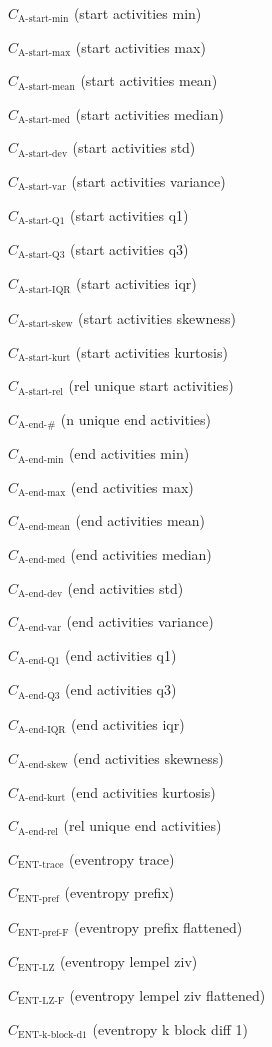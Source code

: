 \documentclass[a4paper]{article}
\newcommand{\startactivitiesrelname}{\text{A-start-rel}}
\newcommand{\startactivitiesrel}{C_{\startactivitiesrelname}}
\newcommand{\startminname}{\text{A-start-min}}
\newcommand{\startmin}{C_{\startminname}}
\newcommand{\startmaxname}{\text{A-start-max}}
\newcommand{\startmax}{C_{\startmaxname}}
\newcommand{\startmeanname}{\text{A-start-mean}}
\newcommand{\startmean}{C_{\startmeanname}}
\newcommand{\startmedianname}{\text{A-start-med}}
\newcommand{\startmedian}{C_{\startmedianname}}
\newcommand{\startdevname}{\text{A-start-dev}}
\newcommand{\startdev}{C_{\startdevname}}
\newcommand{\startvarname}{\text{A-start-var}}
\newcommand{\startvar}{C_{\startvarname}}
\newcommand{\startqonename}{\text{A-start-Q1}}
\newcommand{\startqone}{C_{\startqonename}}
\newcommand{\startqthreename}{\text{A-start-Q3}}
\newcommand{\startqthree}{C_{\startqthreename}}
\newcommand{\startiqrname}{\text{A-start-IQR}}
\newcommand{\startiqr}{C_{\startiqrname}}
\newcommand{\startskewname}{\text{A-start-skew}}
\newcommand{\startskew}{C_{\startskewname}}
\newcommand{\startkurtname}{\text{A-start-kurt}}
\newcommand{\startkurt}{C_{\startkurtname}}
\newcommand{\lastactivitiesname}{\text{A-end-\#}}
\newcommand{\lastactivities}{C_{\lastactivitiesname}}
\newcommand{\lastactivitiesrelname}{\text{A-end-rel}}
\newcommand{\lastactivitiesrel}{C_{\lastactivitiesrelname}}
\newcommand{\lastminname}{\text{A-end-min}}
\newcommand{\lastmin}{C_{\lastminname}}
\newcommand{\lastmaxname}{\text{A-end-max}}
\newcommand{\lastmax}{C_{\lastmaxname}}
\newcommand{\lastmeanname}{\text{A-end-mean}}
\newcommand{\lastmean}{C_{\lastmeanname}}
\newcommand{\lastmedianname}{\text{A-end-med}}
\newcommand{\lastmedian}{C_{\lastmedianname}}
\newcommand{\lastdevname}{\text{A-end-dev}}
\newcommand{\lastdev}{C_{\lastdevname}}
\newcommand{\lastvarname}{\text{A-end-var}}
\newcommand{\lastvar}{C_{\lastvarname}}
\newcommand{\lastqonename}{\text{A-end-Q1}}
\newcommand{\lastqone}{C_{\lastqonename}}
\newcommand{\lastqthreename}{\text{A-end-Q3}}
\newcommand{\lastqthree}{C_{\lastqthreename}}
\newcommand{\lastiqrname}{\text{A-end-IQR}}
\newcommand{\lastiqr}{C_{\lastiqrname}}
\newcommand{\lastskewname}{\text{A-end-skew}}
\newcommand{\lastskew}{C_{\lastskewname}}
\newcommand{\lastkurtname}{\text{A-end-kurt}}
\newcommand{\lastkurt}{C_{\lastkurtname}}
\newcommand{\enttracename}{\text{ENT-trace}}
\newcommand{\enttrace}{C_{\enttracename}}
\newcommand{\entprefixname}{\text{ENT-pref}}
\newcommand{\entprefix}{C_{\entprefixname}}
\newcommand{\entprefixflatname}{\text{ENT-pref-F}}
\newcommand{\entprefixflat}{C_{\entprefixflatname}}
\newcommand{\entlempelzivname}{\text{ENT-LZ}}
\newcommand{\entlempelziv}{C_{\entlempelzivname}}
\newcommand{\entlempelzivflatname}{\text{ENT-LZ-F}}
\newcommand{\entlempelzivflat}{C_{\entlempelzivflatname}}
\newcommand{\entkblockdonename}{\text{ENT-k-block-d1}}
\newcommand{\entkblockdone}{C_{\entkblockdonename}}
\begin{document}
\begin{compactenum}
\item $\startmin$ (start activities min)
\item $\startmax$ (start activities max)
\item $\startmean$ (start activities mean)
\item $\startmedian$ (start activities median)
\item $\startdev$ (start activities std)
\item $\startvar$ (start activities variance)
\item $\startqone$ (start activities q1)
\item $\startqthree$ (start activities q3)
\item $\startiqr$ (start activities iqr)
\item $\startskew$ (start activities skewness)
\item $\startkurt$ (start activities kurtosis)
\item $\startactivitiesrel$ (rel unique start activities)
\item $\lastactivities$ (n unique end activities)
\item $\lastmin$ (end activities min)
\item $\lastmax$ (end activities max)
\item $\lastmean$ (end activities mean)
\item $\lastmedian$ (end activities median)
\item $\lastdev$ (end activities std)
\item $\lastvar$ (end activities variance)
\item $\lastqone$ (end activities q1)
\item $\lastqthree$ (end activities q3)
\item $\lastiqr$ (end activities iqr)
\item $\lastskew$ (end activities skewness)
\item $\lastkurt$ (end activities kurtosis)
\item $\lastactivitiesrel$ (rel unique end activities)
\item $\enttrace$ (eventropy trace)
\item $\entprefix$ (eventropy prefix)
\item $\entprefixflat$ (eventropy prefix flattened)
\item $\entlempelziv$ (eventropy lempel ziv)
\item $\entlempelzivflat$ (eventropy lempel ziv flattened)
\item $\entkblockdone$ (eventropy k block diff 1)

\end{compactenum}
\end{document}

